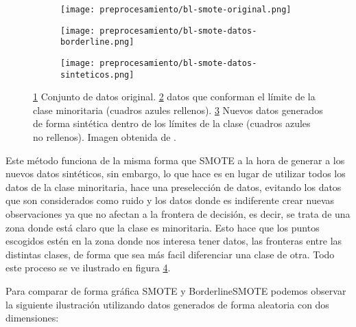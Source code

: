 \begin{figure}[H]
    \centering
    \begin{subfigure}[b]{0.33\textwidth}
		  \texttt{[image: preprocesamiento/bl-smote-original.png]}
        \caption{}
        \label{fig:blSMOTE-orig}
    \end{subfigure}
    \begin{subfigure}[b]{0.33\textwidth}
        \texttt{[image: preprocesamiento/bl-smote-datos-borderline.png]}
        \caption{}
        \label{fig:blSMOTE-border}
    \end{subfigure}
    \begin{subfigure}[b]{0.33\textwidth}
        \texttt{[image: preprocesamiento/bl-smote-datos-sinteticos.png]}
        \caption{}
        \label{fig:blSMOTE-sintetico}
    \end{subfigure}

    \caption{\ref{fig:blSMOTE-orig} Conjunto de datos original. \ref{fig:blSMOTE-border} datos que conforman el límite de la clase minoritaria (cuadros azules rellenos). \ref{fig:blSMOTE-sintetico} Nuevos datos generados de forma sintética dentro de los límites de la clase (cuadros azules no rellenos). Imagen obtenida de \cite{BL-SMOTE}.}
	 \label{fig:ejemploBL-SMOTE}

\end{figure}

Este método funciona de la misma forma que SMOTE a la hora de generar a los nuevos datos sintéticos, sin embargo, lo que hace es en lugar de utilizar todos los datos de la clase minoritaria, hace una preselección de datos, evitando los datos que son considerados como ruido y los datos donde es indiferente crear nuevas observaciones ya que no afectan a la frontera de decisión, es decir, se trata de una zona donde está claro que la clase es minoritaria. Esto hace que los puntos escogidos estén en la zona donde nos interesa tener datos, las fronteras entre las distintas clases, de forma que sea más facil diferenciar una clase de otra. Todo este proceso se ve ilustrado en figura \ref{fig:ejemploBL-SMOTE}.


Para comparar de forma gráfica SMOTE y BorderlineSMOTE podemos observar la siguiente ilustración utilizando datos generados de forma aleatoria con dos dimensiones:

